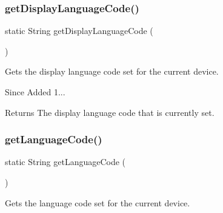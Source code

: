 \subsubsection{\texorpdfstring{get\+Display\+Language\+Code()}{getDisplayLanguageCode()}}
{\footnotesize\ttfamily static String get\+Display\+Language\+Code (\begin{DoxyParamCaption}{ }\end{DoxyParamCaption})\hspace{0.3cm}{\ttfamily [static]}}



Gets the display language code set for the current device. 

\begin{DoxySince}{Since}
Added 1... 
\end{DoxySince}
\begin{DoxyReturn}{Returns}
The display language code that is currently set. 
\end{DoxyReturn}
\mbox{\label{classcom_1_1toast_1_1android_1_1gamebase_1_1_gamebase_af29fbd83fadd34bb0907d191e44effa0}} 
\subsubsection{\texorpdfstring{get\+Language\+Code()}{getLanguageCode()}}
{\footnotesize\ttfamily static String get\+Language\+Code (\begin{DoxyParamCaption}{ }\end{DoxyParamCaption})\hspace{0.3cm}{\ttfamily [static]}}



Gets the language code set for the current device. 

